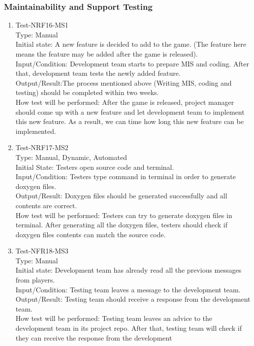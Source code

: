 \documentclass[12pt]{article}
\begin{document}
\subsubsection{Maintainability and Support Testing}
\begin{enumerate}[1.]
\item Test-NRF16-MS1\\
Type: Manual\\
Initial state: A new feature is decided to add to
the game. (The feature here means the feature may
be added after the game is released).\\
Input/Condition: Development team starts to
prepare MIS and coding. After that, development
team tests the newly added feature.\\
Output/Result:The process mentioned above (Writing
MIS, coding and testing) should be completed
within two weeks.\\
How test will be performed: After the game is 
released, project manager should come up with a 
new feature and let development team to implement this new feature. As a result, we can time how 
long this new feature can be implemented.
\item Test-NRF17-MS2\\
Type: Manual, Dynamic, Automated\\
Initial State: Testers open source code and 
terminal.\\
Input/Condition: Testers type command in terminal
in order to generate doxygen files.\\
Output/Result: Doxygen files should be generated
successfully and all contents are correct.\\
How test will be performed: Testers can try to generate doxygen files in terminal. After 
generating all the doxygen files, testers should
check if doxygen files contents can match 
the source code.
\item Test-NFR18-MS3\\
Type: Manual\\
Initial state: Development team has already read 
all the previous messages from players.\\
Input/Condition: Testing team leaves a message to the
development team.\\
Output/Result: Testing team should receive a response from the development team.\\
How test will be performed: Testing team leaves an
advice to the development team in its project repo. After that, testing team will check if they
can receive the response from the development 

\end{enumerate}
\end{document}
